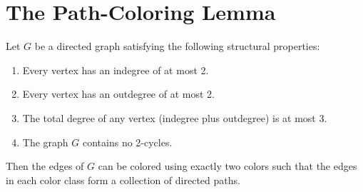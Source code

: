 \section{The Path-Coloring Lemma} \label{sec:path_coloring}
\begin{lemma}
Let $G$ be a directed graph satisfying the following structural properties:
\begin{enumerate}
    \item Every vertex has an indegree of at most 2.
    \item Every vertex has an outdegree of at most 2.
    \item The total degree of any vertex (indegree plus outdegree) is at most 3.
    \item The graph $G$ contains no 2-cycles.
\end{enumerate}
Then the edges of $G$ can be colored using exactly two colors such that the
edges in each color class form a collection of directed paths.
\end{lemma}
